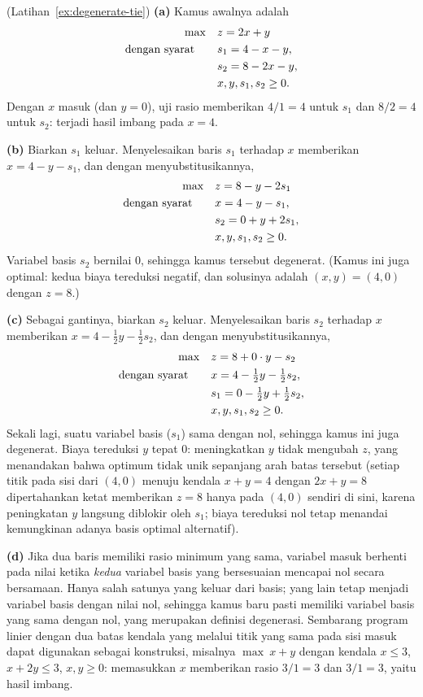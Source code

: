 \begin{solution}(Latihan~\ref{ex:degenerate-tie})
\textbf{(a)} Kamus awalnya adalah
\[
\begin{aligned}
\max\quad & z = 2x + y \\
\mbox{dengan syarat}\quad\quad & s_1 = 4 - x - y, \\
& s_2 = 8 - 2x - y, \\
& x, y, s_1, s_2 \geq 0.
\end{aligned}
\]
Dengan $x$ masuk (dan $y = 0$), uji rasio memberikan $4/1 = 4$ untuk $s_1$ dan $8/2 = 4$ untuk $s_2$: terjadi hasil imbang pada $x = 4$.

\textbf{(b)} Biarkan $s_1$ keluar. Menyelesaikan baris $s_1$ terhadap $x$ memberikan $x = 4 - y - s_1$, dan dengan menyubstitusikannya,
\[
\begin{aligned}
\max\quad & z = 8 - y - 2s_1 \\
\mbox{dengan syarat}\quad\quad & x = 4 - y - s_1, \\
& s_2 = 0 + y + 2s_1, \\
& x, y, s_1, s_2 \geq 0.
\end{aligned}
\]
Variabel basis $s_2$ bernilai $0$, sehingga kamus tersebut degenerat. (Kamus ini juga optimal: kedua biaya tereduksi negatif, dan solusinya adalah $(x, y) = (4, 0)$ dengan $z = 8$.)

\textbf{(c)} Sebagai gantinya, biarkan $s_2$ keluar. Menyelesaikan baris $s_2$ terhadap $x$ memberikan $x = 4 - \tfrac12 y - \tfrac12 s_2$, dan dengan menyubstitusikannya,
\[
\begin{aligned}
\max\quad & z = 8 + 0 \cdot y - s_2 \\
\mbox{dengan syarat}\quad\quad & x = 4 - \tfrac12 y - \tfrac12 s_2, \\
& s_1 = 0 - \tfrac12 y + \tfrac12 s_2, \\
& x, y, s_1, s_2 \geq 0.
\end{aligned}
\]
Sekali lagi, suatu variabel basis ($s_1$) sama dengan nol, sehingga kamus ini juga degenerat. Biaya tereduksi $y$ tepat $0$: meningkatkan $y$ tidak mengubah $z$, yang menandakan bahwa optimum tidak unik sepanjang arah batas tersebut (setiap titik pada sisi dari $(4,0)$ menuju kendala $x + y = 4$ dengan $2x + y = 8$ dipertahankan ketat memberikan $z = 8$ hanya pada $(4,0)$ sendiri di sini, karena peningkatan $y$ langsung diblokir oleh $s_1$; biaya tereduksi nol tetap menandai kemungkinan adanya basis optimal alternatif).

\textbf{(d)} Jika dua baris memiliki rasio minimum yang sama, variabel masuk berhenti pada nilai ketika \emph{kedua} variabel basis yang bersesuaian mencapai nol secara bersamaan. Hanya salah satunya yang keluar dari basis; yang lain tetap menjadi variabel basis dengan nilai nol, sehingga kamus baru pasti memiliki variabel basis yang sama dengan nol, yang merupakan definisi degenerasi. Sembarang program linier dengan dua batas kendala yang melalui titik yang sama pada sisi masuk dapat digunakan sebagai konstruksi, misalnya $\max\ x + y$ dengan kendala $x \leq 3$, $x + 2y \leq 3$, $x, y \geq 0$: memasukkan $x$ memberikan rasio $3/1 = 3$ dan $3/1 = 3$, yaitu hasil imbang.
\end{solution}
